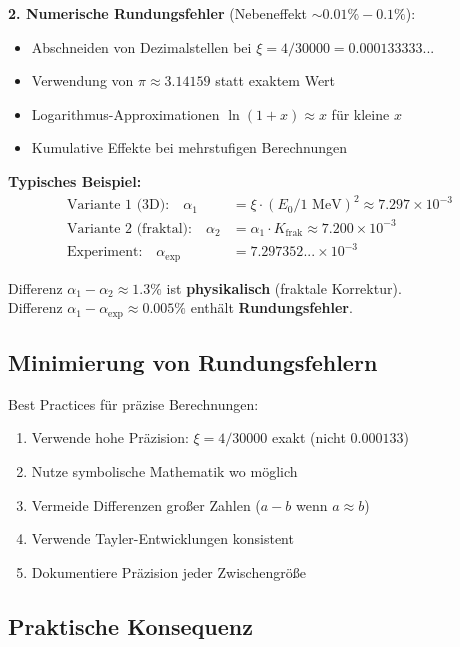 		\textbf{2. Numerische Rundungsfehler} (Nebeneffekt $\sim 0.01\% - 0.1\%$):
		\begin{itemize}
			\item Abschneiden von Dezimalstellen bei $\xi = 4/30000 = 0.000133333...$
			\item Verwendung von $\pi \approx 3.14159$ statt exaktem Wert
			\item Logarithmus-Approximationen $\ln(1+x) \approx x$ für kleine $x$
			\item Kumulative Effekte bei mehrstufigen Berechnungen
		\end{itemize}
		
		\textbf{Typisches Beispiel:}
		\begin{align}
			\text{Variante 1 (3D):} \quad \alpha_1 &= \xi \cdot (E_0/1\text{ MeV})^2 \approx 7.297 \times 10^{-3} \\
			\text{Variante 2 (fraktal):} \quad \alpha_2 &= \alpha_1 \cdot K_{\text{frak}} \approx 7.200 \times 10^{-3} \\
			\text{Experiment:} \quad \alpha_{\text{exp}} &= 7.297352... \times 10^{-3}
		\end{align}
		
		Differenz $\alpha_1 - \alpha_2 \approx 1.3\%$ ist \textbf{physikalisch} (fraktale Korrektur).\\
		Differenz $\alpha_1 - \alpha_{\text{exp}} \approx 0.005\%$ enthält \textbf{Rundungsfehler}.

	
	\subsection{Minimierung von Rundungsfehlern}
	
	Best Practices für präzise Berechnungen:
	\begin{enumerate}
		\item Verwende hohe Präzision: $\xi = 4/30000$ exakt (nicht $0.000133$)
		\item Nutze symbolische Mathematik wo möglich
		\item Vermeide Differenzen großer Zahlen ($a - b$ wenn $a \approx b$)
		\item Verwende Tayler-Entwicklungen konsistent
		\item Dokumentiere Präzision jeder Zwischengröße
	\end{enumerate}
	
	\subsection{Praktische Konsequenz}
	
